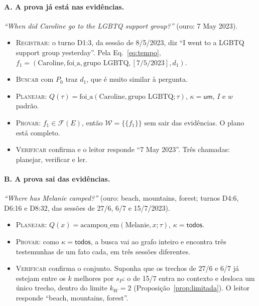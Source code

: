 \documentclass[11pt]{article}
\theoremstyle{definition}
\theoremstyle{plain}
\newcommand{\op}[1]{\textsc{#1}}
\newcommand{\F}{\mathcal{F}}          %
\newcommand{\W}{\mathcal{W}}          %
\newcommand{\um}{\textsf{um}}
\newcommand{\todos}{\textsf{todos}}
\begin{document}
\paragraph{A. A prova já está nas evidências.} \emph{``When did Caroline go
to the LGBTQ support group?''} (ouro: 7 May 2023).
\begin{itemize}[leftmargin=*,itemsep=1pt]
\item \op{Registrar}: o turno D1:3, da sessão de 8/5/2023, diz ``I went to a
  LGBTQ support group yesterday''. Pela Eq.~\eqref{eq:tempo},
  $f_1=(\text{Caroline},\text{foi\_a},\text{grupo LGBTQ},[7/5/2023],d_1)$.
\item \op{Buscar} com $P_0$ traz $d_1$, que é muito similar à pergunta.
\item \op{Planejar}: $Q(\tau)=\text{foi\_a}(\text{Caroline},\text{grupo LGBTQ};\tau)$,
  $\kappa=\um$, $I$ e $w$ padrão.
\item \op{Provar}: $f_1\in\F(E)$, então $\W=\{\{f_1\}\}$ sem sair das
  evidências. O plano está completo.
\item \op{Verificar} confirma e o leitor responde ``7 May 2023''. Três
  chamadas: planejar, verificar e ler.
\end{itemize}

\paragraph{B. A prova sai das evidências.} \emph{``Where has Melanie
camped?''} (ouro: beach, mountains, forest; turnos D4:6, D6:16 e D8:32, das
sessões de 27/6, 6/7 e 15/7/2023).
\begin{itemize}[leftmargin=*,itemsep=1pt]
\item \op{Planejar}: $Q(x)=\text{acampou\_em}(\text{Melanie},x;\tau)$,
  $\kappa=\todos$.
\item \op{Provar}: como $\kappa=\todos$, a busca vai ao grafo inteiro e
  encontra três testemunhas de um fato cada, em três sessões diferentes.
\item \op{Verificar} confirma o conjunto. Suponha que os trechos de 27/6 e 6/7
  já estejam entre os $k$ melhores por $s_P$: o de 15/7 entra no contexto e
  desloca um único trecho, dentro do limite $k_W=2$
  (Proposição~\ref{prop:limitada}). O leitor responde ``beach, mountains,
  forest''.
\end{itemize}
\end{document}
